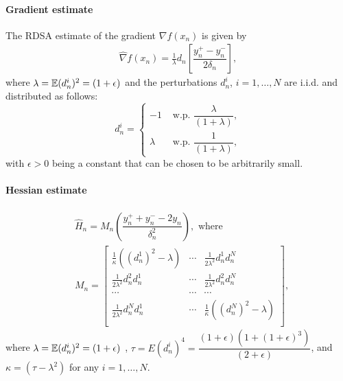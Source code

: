 \documentclass[twocolumn]{IEEEtran}
\begin{document}
\paragraph{\textbf{Gradient estimate}}
The RDSA estimate of the gradient $\nabla f(x_n)$ is given by
\begin{align}
\label{eq:grad-ber}
\widehat\nabla f(x_n) = \frac1{\lambda} d_n \left[ \dfrac{y_n^+ - y_n^-}{2\delta_n}\right],
\end{align}
where $\lambda = \mathbb{E}(d_n^i)^2 = (1+\epsilon)$ and the perturbations $d_n^i$, $i=1,\ldots,N$ are i.i.d. and distributed  as follows: 
\begin{equation}
\label{eq:det-proj}
 d_n^i =
  \begin{cases}
   -1 &  \text{ w.p. } \dfrac{\lambda}{(1+\lambda)}, \\
   \lambda &  \text{ w.p. } \dfrac{1}{(1+\lambda)},
  \end{cases}
\end{equation}
with $\epsilon>0$ being a constant that can be chosen to be arbitrarily small.

\paragraph{\textbf{Hessian estimate}}

\begin{align}
\label{eq:2rdsa-estimate-ber}
&\widehat H_n = M_n \left(\dfrac{y_n^+ + y_n^- - 2 y_n}{\delta_n^2}\right), \text{ where }\\
& M_n =
\left[
\begin{array}{ccc}
\frac{1}{\kappa}\left((d_n^1)^2\!-\lambda\right) & \cdots & \frac{1}{2 \lambda^2}d_n^1 d_n^N\\
\frac{1}{2 \lambda^2}d_n^2 d_n^1  &  \cdots & \frac{1}{2 \lambda^2}d_n^2 d_n^N\\
\cdots&\cdots&\cdots\\
\frac{1}{2 \lambda^2}d_n^N d_n^1 & \cdots &  \frac{1}{\kappa}\left((d_n^N)^2-\lambda\right) \\
\end{array}
\right],\nonumber
\end{align}
where $\lambda = \mathbb{E}(d_n^i)^2 = (1+\epsilon)$ , $\tau = E (d_n^i)^4= \dfrac{(1+\epsilon)(1+(1+\epsilon)^3)}{(2+\epsilon)}$, and $\kappa = \left(\tau - \lambda^2\right)$ for any $i=1,\ldots,N$. 
\end{document}
